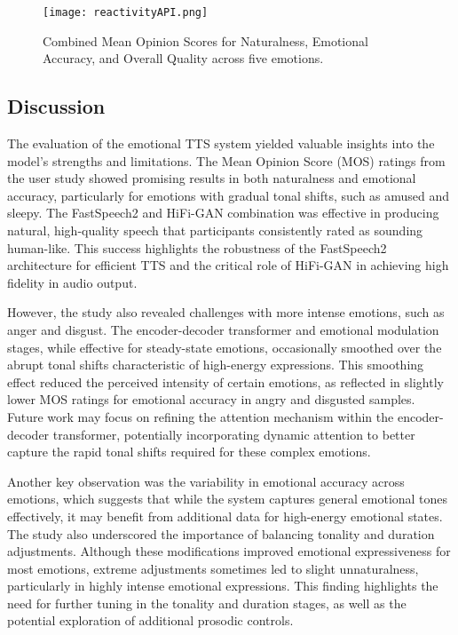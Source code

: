 \begin{figure}[h!]
    \centering
    \texttt{[image: reactivityAPI.png]}
    \caption{Combined Mean Opinion Scores for Naturalness, Emotional Accuracy, and Overall Quality across five emotions.}
    \vspace{0.1cm}
    \label{fig:reactivity_api}
\end{figure}



\subsection{Discussion}
The evaluation of the emotional TTS system yielded valuable insights into the model’s strengths and limitations. The Mean Opinion Score (MOS) ratings from the user study showed promising results in both naturalness and emotional accuracy, particularly for emotions with gradual tonal shifts, such as amused and sleepy. The FastSpeech2 and HiFi-GAN combination was effective in producing natural, high-quality speech that participants consistently rated as sounding human-like. This success highlights the robustness of the FastSpeech2 architecture for efficient TTS and the critical role of HiFi-GAN in achieving high fidelity in audio output.

However, the study also revealed challenges with more intense emotions, such as anger and disgust. The encoder-decoder transformer and emotional modulation stages, while effective for steady-state emotions, occasionally smoothed over the abrupt tonal shifts characteristic of high-energy expressions. This smoothing effect reduced the perceived intensity of certain emotions, as reflected in slightly lower MOS ratings for emotional accuracy in angry and disgusted samples. Future work may focus on refining the attention mechanism within the encoder-decoder transformer, potentially incorporating dynamic attention to better capture the rapid tonal shifts required for these complex emotions.

Another key observation was the variability in emotional accuracy across emotions, which suggests that while the system captures general emotional tones effectively, it may benefit from additional data for high-energy emotional states. The study also underscored the importance of balancing tonality and duration adjustments. Although these modifications improved emotional expressiveness for most emotions, extreme adjustments sometimes led to slight unnaturalness, particularly in highly intense emotional expressions. This finding highlights the need for further tuning in the tonality and duration stages, as well as the potential exploration of additional prosodic controls.

